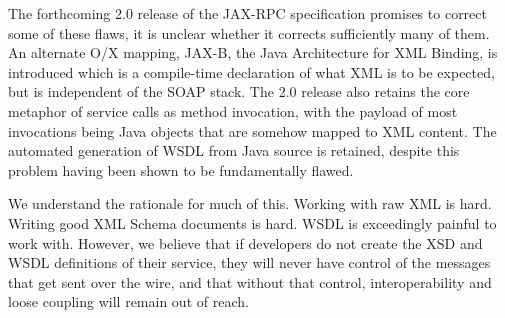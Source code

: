 The forthcoming 2.0 release of the JAX-RPC specification promises to
correct some of these flaws, it is unclear whether it corrects
sufficiently many of them. An alternate O/X mapping, JAX-B, the Java
Architecture for XML Binding, is introduced which is a compile-time
declaration of what XML is to be expected, but is independent of the
SOAP stack. The 2.0 release also retains the core metaphor of service
calls as method invocation, with the payload of most invocations
being Java objects that are somehow mapped to XML content. The
automated generation of WSDL from Java source is retained, despite
this problem having been shown to be fundamentally flawed.

We understand the rationale for much of this. Working with raw XML is
hard.  Writing good XML Schema documents is hard. WSDL is exceedingly
painful to work with. However, we believe that if developers do not
create the XSD and WSDL definitions of their service, they will never
have control of the messages that get sent over the wire, and that
without that control, interoperability and loose coupling will remain
out of reach.

